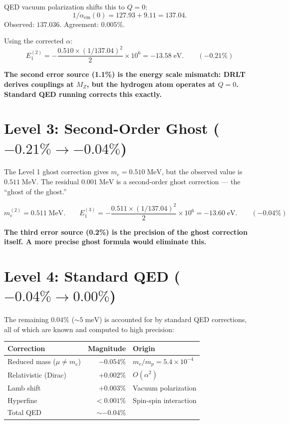 \documentclass[12pt]{article}
\theoremstyle{remark}
\begin{document}
QED vacuum polarization shifts this to $Q = 0$:
\begin{equation}
1/\alpha_\text{em}(0) = 127.93 + 9.11 = 137.04.
\end{equation}
Observed: $137.036$. Agreement: $0.005\%$.

Using the corrected $\alpha$:
\begin{equation}
E_1^{(2)} = -\frac{0.510 \times (1/137.04)^2}{2} \times 10^6 = -13.58\;\text{eV}. \qquad (-0.21\%)
\end{equation}

\textbf{The second error source (1.1\%) is the energy scale mismatch: DRLT derives couplings at $M_Z$, but the hydrogen atom operates at $Q = 0$. Standard QED running corrects this exactly.}

\section{Level 3: Second-Order Ghost ($-0.21\% \to -0.04\%$)}

The Level 1 ghost correction gives $m_e = 0.510\;\text{MeV}$, but the observed value is $0.511\;\text{MeV}$. The residual $0.001\;\text{MeV}$ is a second-order ghost correction --- the ``ghost of the ghost.''

\begin{equation}
m_e^{(2)} = 0.511\;\text{MeV}. \qquad E_1^{(3)} = -\frac{0.511 \times (1/137.04)^2}{2} \times 10^6 = -13.60\;\text{eV}. \qquad (-0.04\%)
\end{equation}

\textbf{The third error source (0.2\%) is the precision of the ghost correction itself. A more precise ghost formula would eliminate this.}

\section{Level 4: Standard QED ($-0.04\% \to 0.00\%$)}

The remaining $0.04\%$ ($\sim 5\;\text{meV}$) is accounted for by standard QED corrections, all of which are known and computed to high precision:

\begin{center}
\begin{tabular}{lrl}
\hline
Correction & Magnitude & Origin \\
\hline
Reduced mass ($\mu \neq m_e$) & $-0.054\%$ & $m_e/m_p = 5.4 \times 10^{-4}$ \\
Relativistic (Dirac) & $+0.002\%$ & $O(\alpha^2)$ \\
Lamb shift & $+0.003\%$ & Vacuum polarization \\
Hyperfine & $< 0.001\%$ & Spin-spin interaction \\
\hline
Total QED & $\sim -0.04\%$ & \\
\hline
\end{tabular}
\end{center}
\end{document}

